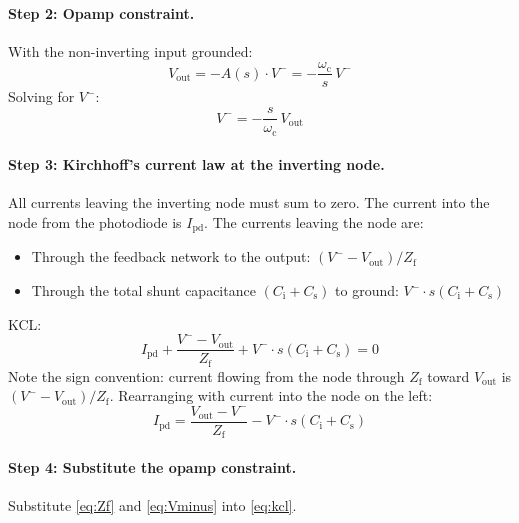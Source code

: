 \documentclass[a4paper,11pt]{article}
\begin{document}
\paragraph{Step 2: Opamp constraint.}

With the non-inverting input grounded:
\begin{equation*}
  V_{\mathrm{out}} = -A(s) \cdot V^{-}
  = -\frac{\omega_{\mathrm{c}}}{s}\,V^{-}
\end{equation*}
Solving for $V^-$:
\begin{equation}
  V^{-} = -\frac{s}{\omega_{\mathrm{c}}}\,V_{\mathrm{out}}
  \label{eq:Vminus}
\end{equation}

\paragraph{Step 3: Kirchhoff's current law at the inverting node.}

All currents leaving the inverting node must sum to zero.  The current
into the node from the photodiode is $I_{\mathrm{pd}}$.  The currents
leaving the node are:
\begin{itemize}
  \item Through the feedback network to the output:
    $(V^{-} - V_{\mathrm{out}}) / Z_{\mathrm{f}}$
  \item Through the total shunt capacitance
    $(C_{\mathrm{i}} + C_{\mathrm{s}})$ to ground:
    $V^{-} \cdot s(C_{\mathrm{i}} + C_{\mathrm{s}})$
\end{itemize}
KCL:
\begin{equation*}
  I_{\mathrm{pd}}
  + \frac{V^{-} - V_{\mathrm{out}}}{Z_{\mathrm{f}}}
  + V^{-} \cdot s(C_{\mathrm{i}} + C_{\mathrm{s}}) = 0
\end{equation*}
Note the sign convention: current flowing from the node through
$Z_{\mathrm{f}}$ toward $V_{\mathrm{out}}$ is
$(V^{-} - V_{\mathrm{out}})/Z_{\mathrm{f}}$.  Rearranging with
current into the node on the left:
\begin{equation}
  I_{\mathrm{pd}}
  = \frac{V_{\mathrm{out}} - V^{-}}{Z_{\mathrm{f}}}
  - V^{-} \cdot s(C_{\mathrm{i}} + C_{\mathrm{s}})
  \label{eq:kcl}
\end{equation}

\paragraph{Step 4: Substitute the opamp constraint.}

Substitute \eqref{eq:Zf} and \eqref{eq:Vminus} into \eqref{eq:kcl}.
\end{document}
